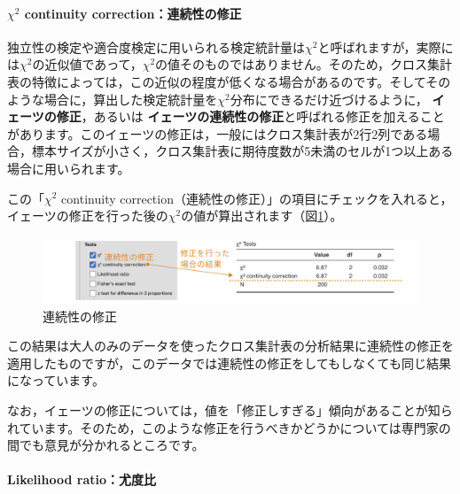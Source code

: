 \documentclass[
  12pt,
  a5jpaper,
  lualatex, ja=standard]{bxjsbook}
\renewcommand{\emph}[1]{\textbf{\color{emph} #1}}
\begin{document}
\hypertarget{chi2-continuity-correctionux9023ux7d9aux6027ux306eux4feeux6b63}{%
\paragraph*{\texorpdfstring{\(\chi^2\) continuity correction：連続性の修正}{\textbackslash chi\^{}2 continuity correction：連続性の修正}}\label{chi2-continuity-correctionux9023ux7d9aux6027ux306eux4feeux6b63}}

独立性の検定や適合度検定に用いられる検定統計量は\(\chi^2\)と呼ばれますが，実際には\(\chi^2\)の近似値であって，\(\chi^2\)の値そのものではありません。そのため，クロス集計表の特徴によっては，この近似の程度が低くなる場合があるのです。そしてそのような場合に，算出した検定統計量を\(\chi^2\)分布にできるだけ近づけるように，\emph{イェーツの修正}，あるいは\emph{イェーツの連続性の修正}と呼ばれる修正を加えることがあります。このイェーツの修正は，一般にはクロス集計表が2行2列である場合，標本サイズが小さく，クロス集計表に期待度数が5未満のセルが1つ以上ある場合に用いられます。

この「\(\chi^2\) continuity correction（連続性の修正）」の項目にチェックを入れると，イェーツの修正を行った後の\(\chi^2\)の値が算出されます（図\ref{fig:frequencies-chisq-continuity}）。

\begin{figure}[!ht]

{\centering \includegraphics[width=1\linewidth]{images/frequencies/chisq-continuity} 

}

\caption{連続性の修正}\label{fig:frequencies-chisq-continuity}
\end{figure}

この結果は大人のみのデータを使ったクロス集計表の分析結果に連続性の修正を適用したものですが，このデータでは連続性の修正をしてもしなくても同じ結果になっています。

なお，イェーツの修正については，値を「修正しすぎる」傾向があることが知られています。そのため，このような修正を行うべきかどうかについては専門家の間でも意見が分かれるところです。

\hypertarget{likelihood-ratioux5c24ux5ea6ux6bd4}{%
\paragraph*{Likelihood ratio：尤度比}\label{likelihood-ratioux5c24ux5ea6ux6bd4}}
\end{document}
